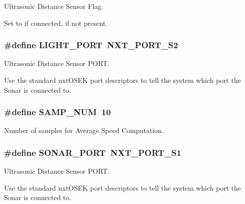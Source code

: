 Ultrasonic Distance Sensor Flag. 

Set to {} if connected, {} if not present. \hypertarget{group___b_r_o_s_client_gafe5f0db4351597e50603e53a4a7d0051}{
\subsubsection[{LIGHT\_\-PORT}]{\setlength{\rightskip}{0pt plus 5cm}\#define LIGHT\_\-PORT~NXT\_\-PORT\_\-S2}}
\label{group___b_r_o_s_client_gafe5f0db4351597e50603e53a4a7d0051}


Ultrasonic Distance Sensor PORT. 

Use the standard nxtOSEK port descriptors to tell the system which port the Sonar is connected to. \hypertarget{group___b_r_o_s_client_gaeef07cfe778af527fd0738e828efa43a}{
\subsubsection[{SAMP\_\-NUM}]{\setlength{\rightskip}{0pt plus 5cm}\#define SAMP\_\-NUM~10}}
\label{group___b_r_o_s_client_gaeef07cfe778af527fd0738e828efa43a}


Number of samples for Average Speed Computation. 

\hypertarget{group___b_r_o_s_client_ga72f4e7f36b69fdd1b3874e0824c0316a}{
\subsubsection[{SONAR\_\-PORT}]{\setlength{\rightskip}{0pt plus 5cm}\#define SONAR\_\-PORT~NXT\_\-PORT\_\-S1}}
\label{group___b_r_o_s_client_ga72f4e7f36b69fdd1b3874e0824c0316a}


Ultrasonic Distance Sensor PORT. 

Use the standard nxtOSEK port descriptors to tell the system which port the Sonar is connected to. 